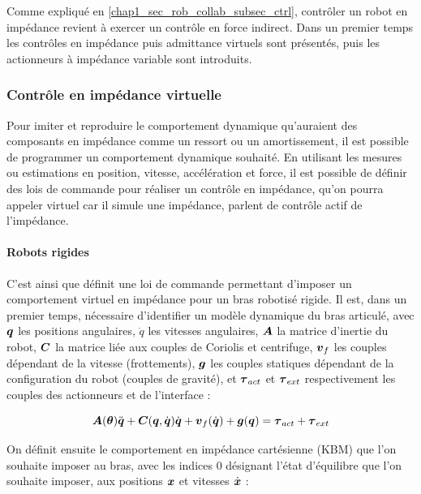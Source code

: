 Comme expliqué en \cref{chap1_sec_rob_collab_subsec_ctrl}, contrôler un robot en impédance revient à exercer un contrôle en force indirect. Dans un premier temps les contrôles en impédance puis admittance virtuels sont présentés, puis les actionneurs à impédance variable sont introduits.

\subsubsection{Contrôle en impédance virtuelle} \label{chap2_sec_cmd_collab_subsec_cmd_imp_1}

Pour imiter et reproduire le comportement dynamique qu'auraient des composants en impédance comme un ressort ou un amortissement, il est possible de programmer un comportement dynamique souhaité. En utilisant les mesures ou estimations en position, vitesse, accélération et force, il est possible de définir des lois de commande pour réaliser un contrôle en impédance, qu'on pourra appeler virtuel car il simule une impédance, \textcite{vanderborght_variable_2013} parlent de contrôle actif de l'impédance. 

\paragraph{Robots rigides} \label{chap2_sec_cmd_collab_subsec_cmd_imp_1_1}

C'est ainsi que \textcite{hogan_impedance_1985b} définit une loi de commande permettant d'imposer un comportement virtuel en impédance pour un bras robotisé rigide. Il est, dans un premier temps, nécessaire d'identifier un modèle dynamique du bras articulé, avec $\vect{q}$ les positions angulaires, $\dot{q}$ les vitesses angulaires, $\matr{A}$ la matrice d'inertie du robot, $\matr{C}$ la matrice liée aux couples de Coriolis et centrifuge, $\vect{V}_f $ les couples dépendant de la vitesse (frottements), $\vect{g}$ les couples statiques dépendant de la configuration du robot (couples de gravité), et $\vect{\tau}_{act}$ et $\vect{\tau}_{ext}$ respectivement les couples des actionneurs et de l'interface :

\begin{equation} \label{eq_modele_bras_hogan_1985}
	\matr{A}(\vect{\theta})\ddot{\vect{q}} + \matr{C}(\vect{q}, \dot{\vect{q}})\dot{\vect{q}} + \vect{v}_f(\dot{\vect{q}}) + \vect{g}(\vect{q}) = \vect{\tau}_{act} + \vect{\tau}_{ext} 
\end{equation}

On définit ensuite le comportement en impédance cartésienne (KBM) que l'on souhaite imposer au bras, avec les indices $0$ désignant l'état d'équilibre que l'on souhaite imposer, aux positions $\vect{X}$ et vitesses $\dot{\vect{X}}$ :


